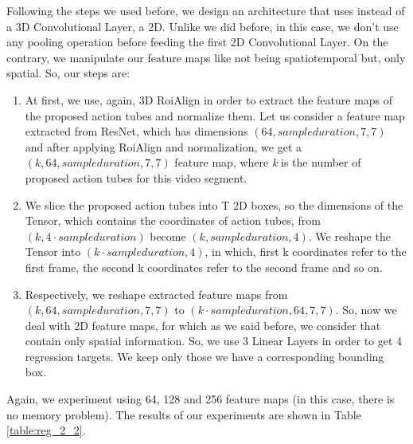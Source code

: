 Following the steps we used before, we design an architecture that uses instead of a 3D Convolutional Layer, a 2D. Unlike we did before, in this case, we don't use any pooling
operation before feeding the first 2D Convolutional Layer. On the contrary, we manipulate our feature maps like not being spatiotemporal but,
only spatial. So, our steps are:
\begin{enumerate}
\item At first, we use, again, 3D RoiAlign in order to extract the feature maps of the proposed action tubes and normalize them. Let us consider a feature map
  extracted from ResNet, which has dimensions $(64,sample duration,7,7)$ and after applying RoiAlign and normalization, we get a $(k,64,sample duration,7,7)$ feature map,
  where \textit{k} is the number of proposed  action tubes for this video segment.
\item We slice the proposed action tubes into T 2D boxes, so the dimensions of the Tensor, which contains the coordinates of action tubes, from $(k,4\cdot sample duration)$
  become $(k,sample duration, 4)$. We reshape the Tensor into $(k\cdot sample duration, 4)$, in which, first k coordinates refer to the first frame, the
  second k coordinates refer to the second frame and so on.
\item Respectively, we reshape extracted feature maps from $(k, 64, sample duration, 7, 7)$ to $(k\cdot sample duration, 64, 7, 7)$. So, now we deal with 2D feature maps, for which as we said before,
  we consider that contain only spatial information. So, we use 3 Linear Layers in order to get 4 regression targets. We keep only those we have a corresponding bounding
  box.
\end{enumerate}

Again, we experiment using 64, 128 and 256 feature maps (in this case, there is no memory problem). The results of our experiments are shown in Table \ref{table:reg_2_2}.

